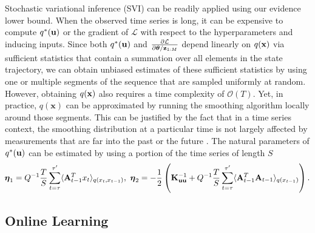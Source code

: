\documentclass{article} %
\newcommand{\fix}{\marginpar{FIX}}
\newcommand{\n}[1]{\mathbf{#1}}
\newcommand{\x}{\mathbf{x}}
\begin{document}
Stochastic variational inference (SVI) \citep{hoffman2013stochastic} can be readily applied using our evidence lower bound. When the observed time series is long, it can be expensive to compute $q^*({\bf u})$ or the gradient of $\mathcal{L}$ with respect to the hyperparameters and inducing inputs. Since both $q^*({\bf u})$ and $\frac{\partial \mathcal{L}}{\partial \boldsymbol{\theta}/{\bf z}_{1:M}}$ depend linearly on $q({\bf x})$ via sufficient statistics that contain a summation over all elements in the state trajectory, we can obtain unbiased estimates of these sufficient statistics by using one or multiple segments of the sequence that are sampled uniformly at random. However, obtaining $q({\bf x})$ also requires a time complexity of $\mathcal{O}(T)$. Yet, in practice, $q(\x)$ can be approximated by running the smoothing algorithm locally around those segments. This can be justified by the fact that in a time series context, the smoothing distribution at a particular time is not largely affected by measurements that are far into the past or the future \citep{Sarkka2013}. The natural parameters of $q^*({\bf u})$ can be estimated by using a portion of the time series of length $S$
\vspace{-1mm}
\begin{equation}
\!\boeta_1 = Q^{-1} \frac{T}{S} \sum_{t=\tau}^{\tau'} \langle \n{A}_{t-1}^T x_{t} \rangle_{q(x_t,x_{t-1})}, \ 
\boeta_2 = -\ha \left( \bK_{\bu \bu}^{-1} + Q^{-1} \frac{T}{S} \sum_{t=\tau}^{\tau'} \langle\n{A}^T_{t-1}\n{A}_{t-1}\rangle_{q(x_{t-1})}  \right). \label{eq:sviqstarunatural}
\end{equation}





\vspace{-2mm}
\subsection{Online Learning}
\end{document}
